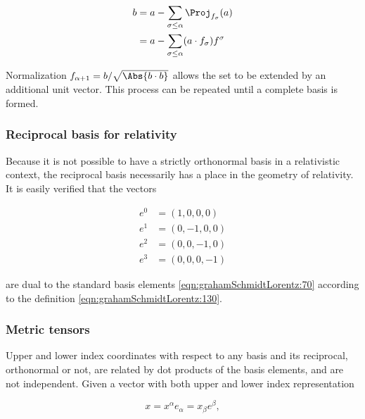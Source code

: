\begin{equation}\label{eqn:grahamSchmidtLorentz:660}
\begin{aligned}
b
&= a - \sum_{\sigma \le \alpha} \Proj_{f_\sigma}(a) \\
&= a - \sum_{\sigma \le \alpha} (a \cdot f_\sigma) f^\sigma
\end{aligned}
\end{equation}

Normalization $f_{\alpha+1} = b/\sqrt{\Abs{b \cdot b}}$ allows the set to be extended by an additional unit vector.  This process can be repeated until a complete basis is formed.

\subsubsection{Reciprocal basis for relativity}

Because it is not possible to have a strictly orthonormal basis in a relativistic context, the reciprocal basis necessarily has a place in the geometry of relativity.
It is easily verified that the vectors

\begin{equation}\label{eqn:grahamSchmidtLorentz:70b}
\begin{aligned}
e^0 &= (1, 0, 0, 0) \\
e^1 &= (0, -1, 0, 0) \\
e^2 &= (0, 0, -1, 0) \\
e^3 &= (0, 0, 0, -1)
\end{aligned}
\end{equation}

are dual to the standard basis elements \ref{eqn:grahamSchmidtLorentz:70} according to the definition \ref{eqn:grahamSchmidtLorentz:130}.

\subsubsection{Metric tensors}

Upper and lower index coordinates with respect to any basis and its reciprocal, orthonormal or not, are related by dot products of the basis elements, and are not independent.  Given a vector with both upper and lower index representation

\begin{equation}\label{eqn:grahamSchmidtLorentz:980}
x = x^\alpha e_\alpha = x_\beta e^\beta,
\end{equation}

